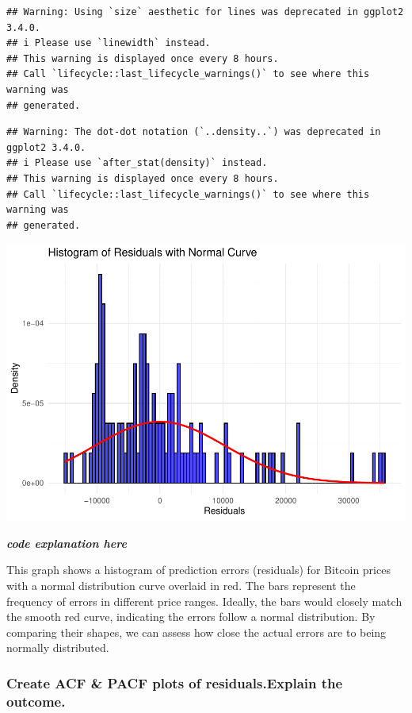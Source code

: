 \documentclass[
]{book}
\begin{document}
\begin{verbatim}
## Warning: Using `size` aesthetic for lines was deprecated in ggplot2 3.4.0.
## i Please use `linewidth` instead.
## This warning is displayed once every 8 hours.
## Call `lifecycle::last_lifecycle_warnings()` to see where this warning was
## generated.
\end{verbatim}

\begin{verbatim}
## Warning: The dot-dot notation (`..density..`) was deprecated in ggplot2 3.4.0.
## i Please use `after_stat(density)` instead.
## This warning is displayed once every 8 hours.
## Call `lifecycle::last_lifecycle_warnings()` to see where this warning was
## generated.
\end{verbatim}

\includegraphics{bookdown-demo_files/figure-latex/unnamed-chunk-24-1.pdf}

\emph{\textbf{code explanation here}}

This graph shows a histogram of prediction errors (residuals) for Bitcoin prices with a normal distribution curve overlaid in red. The bars represent the frequency of errors in different price ranges. Ideally, the bars would closely match the smooth red curve, indicating the errors follow a normal distribution. By comparing their shapes, we can assess how close the actual errors are to being normally distributed.

\subsubsection{Create ACF \& PACF plots of residuals.Explain the outcome.}\label{create-acf-pacf-plots-of-residuals.explain-the-outcome.}
\end{document}
